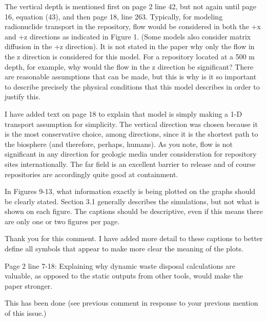 \documentclass[answers,12pt]{exam}
\begin{document}
\begin{questions}
\question The  vertical  depth  is  mentioned  first  on  page  2  line  42,  but  not  again  until  page  16,  equation  (43),  and  then 
page  18,  line  263.  Typically,  for  modeling  radionuclide  transport  in  the repository, flow would be considered 
in  both  the  +x  and  +z  directions as indicated in Figure 1. (Some models also consider matrix diffusion in the 
+z  direction).  It  is  not  stated  in  the  paper  why  only  the  flow  in  the  z  direction  is  considered  for this model. 
For  a  repository  located  at  a  500  m  depth,  for  example, why would the flow in the z direction be significant? 
There  are reasonable assumptions that can be made, but this is why is it so important to describe precisely the 
physical conditions that this model describes in order to justify this.  
\begin{solution}
I have added text on page 18 to explain that model is simply making a 1-D 
        transport assumption for simplicity. The vertical direction was chosen
        because it is the most conservative choice, among directions, since it 
        is the shortest path to the biosphere (and therefore, perhaps, humans). 
        As you note, flow is not significant in any direction for geologic 
        media under consideration for repository sites internationally. The far field 
        is an excellent barrier to release and of course repositories are 
        accordingly quite good at containment.
\end{solution} 

 
\question In  Figures  9-13,  what  information  exactly  is  being  plotted  on  the  graphs should be clearly stated. Section 3.1 
generally  describes  the  simulations, but not what is shown on each figure. The captions should be descriptive, 
even if this means there are only one or two figures per page.  
\begin{solution}
Thank you for this comment. I  have added more detail to these captions to 
        better define all symbols that appear to make more clear the meaning of 
        the plots.
\end{solution} 
 
\question Page  2  line  7-18:  Explaining  why  dynamic  waste  disposal  calculations  are  valuable,  as  opposed  to  the 
static outputs from other tools, would make the paper stronger. 
\begin{solution}
        This has been done (see previous comment in response to your previous 
        mention of this issue.)
\end{solution} 


\end{questions}
\end{document}
